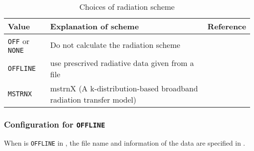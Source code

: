 \begin{table}[h]
\begin{center}
  \caption{Choices of radiation scheme}
  \label{tab:nml_atm_rd}
  \begin{tabularx}{150mm}{lXX} \hline
    \rowcolor[gray]{0.9}  Value & Explanation of scheme & Reference\\ \hline
      \verb|OFF| or \verb|NONE| & Do not calculate the radiation scheme & \\
      \verb|OFFLINE|      & use prescrived radiative data given from a file & \\
      \verb|MSTRNX|       & mstrnX (A k-distribution-based broadband radiation transfer model) & \citet{sekiguchi_2008} \\
    \hline
  \end{tabularx}
\end{center}
\end{table}

\subsubsection{Configuration for \texttt{OFFLINE}}

When  is \verb|OFFLINE| in ,
the file name and information of the data are specified in .

